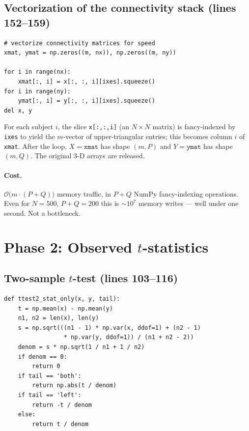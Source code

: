 \documentclass[11pt]{article}
\begin{document}
\subsection{Vectorization of the connectivity stack (lines 152--159)}

\begin{lstlisting}[firstnumber=152]
# vectorize connectivity matrices for speed
xmat, ymat = np.zeros((m, nx)), np.zeros((m, ny))

for i in range(nx):
    xmat[:, i] = x[:, :, i][ixes].squeeze()
for i in range(ny):
    ymat[:, i] = y[:, :, i][ixes].squeeze()
del x, y
\end{lstlisting}

For each subject $i$, the slice \texttt{x[:,:,i]} (an $N\times N$ matrix) is fancy-indexed by \texttt{ixes} to yield the $m$-vector of upper-triangular entries; this becomes column $i$ of \texttt{xmat}. After the loop, $X = \texttt{xmat}$ has shape $(m, P)$ and $Y = \texttt{ymat}$ has shape $(m, Q)$. The original 3-D arrays are released.

\paragraph{Cost.} $\mathcal{O}\bigl(m \cdot (P+Q)\bigr)$ memory traffic, in $P+Q$ NumPy fancy-indexing operations. Even for $N=500$, $P+Q=200$ this is $\sim 10^7$ memory writes --- well under one second. Not a bottleneck.

\section{Phase 2: Observed $t$-statistics}

\subsection{Two-sample $t$-test (lines 103--116)}

\begin{lstlisting}[firstnumber=103]
def ttest2_stat_only(x, y, tail):
    t = np.mean(x) - np.mean(y)
    n1, n2 = len(x), len(y)
    s = np.sqrt(((n1 - 1) * np.var(x, ddof=1) + (n2 - 1)
                 * np.var(y, ddof=1)) / (n1 + n2 - 2))
    denom = s * np.sqrt(1 / n1 + 1 / n2)
    if denom == 0:
        return 0
    if tail == 'both':
        return np.abs(t / denom)
    if tail == 'left':
        return -t / denom
    else:
        return t / denom
\end{lstlisting}
\end{document}
